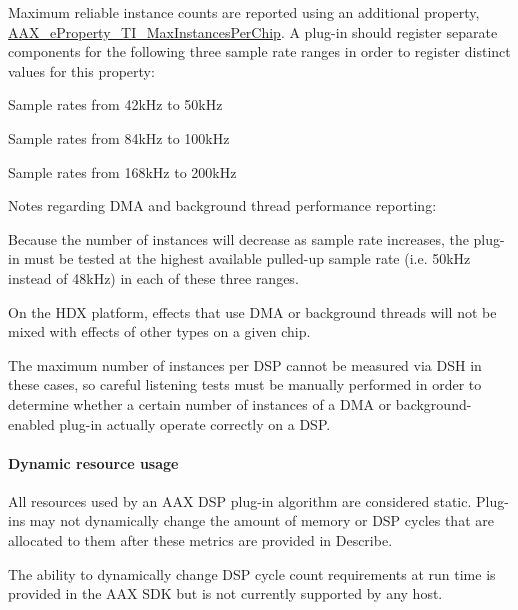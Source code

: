 Maximum reliable instance counts are reported using an additional property, \hyperlink{a00283_a6571f4e41a5dd06e4067249228e2249ea5b85e213113b7f0f7ee4bac4f5eaa59d}{A\+A\+X\+\_\+e\+Property\+\_\+\+T\+I\+\_\+\+Max\+Instances\+Per\+Chip}. A plug-\/in should register separate components for the following three sample rate ranges in order to register distinct values for this property\+: 
\begin{DoxyEnumerate}
\item Sample rates from 42k\+Hz to 50k\+Hz  
\item Sample rates from 84k\+Hz to 100k\+Hz  
\item Sample rates from 168k\+Hz to 200k\+Hz  
\end{DoxyEnumerate}

Notes regarding D\+M\+A and background thread performance reporting\+: 
\begin{DoxyItemize}
\item Because the number of instances will decrease as sample rate increases, the plug-\/in must be tested at the highest available pulled-\/up sample rate (i.\+e. 50k\+Hz instead of 48k\+Hz) in each of these three ranges.  
\item On the H\+D\+X platform, effects that use D\+M\+A or background threads will not be mixed with effects of other types on a given chip.  
\item The maximum number of instances per D\+S\+P cannot be measured via D\+S\+H in these cases, so careful listening tests must be manually performed in order to determine whether a certain number of instances of a D\+M\+A or background-\/enabled plug-\/in actually operate correctly on a D\+S\+P. 
\end{DoxyItemize}

\hypertarget{a00362_subsubsection__dynamic_resource_usage_}{}\paragraph{Dynamic resource usage}\label{a00362_subsubsection__dynamic_resource_usage_}
 All resources used by an A\+A\+X D\+S\+P plug-\/in algorithm are considered static. Plug-\/ins may not dynamically change the amount of memory or D\+S\+P cycles that are allocated to them after these metrics are provided in Describe.

The ability to dynamically change D\+S\+P cycle count requirements at run time is provided in the A\+A\+X S\+D\+K but is not currently supported by any host.

